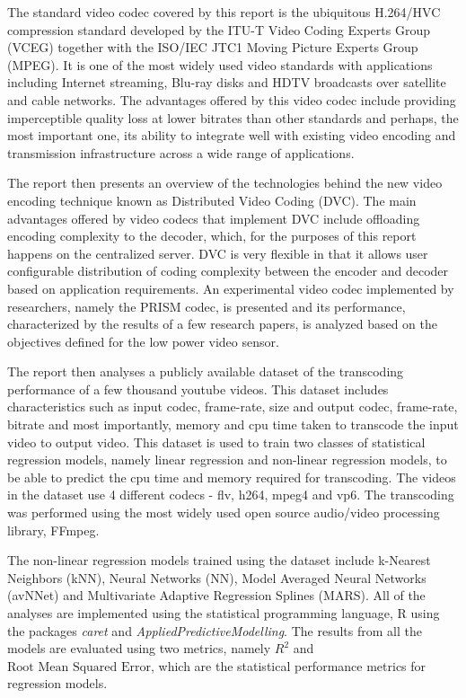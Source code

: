 \documentclass[letterpaper,12pt,titlepage,oneside,final]{report}
\begin{document}
    The standard video codec covered by this report is the ubiquitous H.264/HVC compression standard developed by the ITU-T Video Coding Experts Group (VCEG) together with the ISO/IEC JTC1 Moving Picture Experts Group (MPEG). It is one of the most widely used video standards with applications including Internet streaming, Blu-ray disks and HDTV broadcasts over satellite and cable networks. The advantages offered by this video codec include providing imperceptible quality loss at lower bitrates than other standards and perhaps, the most important one, its ability to integrate well with existing video encoding and transmission infrastructure across a wide range of applications. 

    The report then presents an overview of the technologies behind the new video encoding technique known as Distributed Video Coding (DVC). The main advantages offered by video codecs that implement DVC include offloading encoding complexity to the decoder, which, for the purposes of this report happens on the centralized server. DVC is very flexible in that it allows user configurable distribution of coding complexity between the encoder and decoder based on application requirements. An experimental video codec implemented by researchers, namely the PRISM codec, is presented and its performance, characterized by the results of a few research papers, is analyzed based on the objectives defined for the low power video sensor. 

    The report then analyses a publicly available dataset of the transcoding performance of a few thousand youtube videos. This dataset includes characteristics such as input codec, frame-rate, size and output codec, frame-rate, bitrate and most importantly, memory and cpu time taken to transcode the input video to output video. This dataset is used to train two classes of statistical regression models, namely linear regression and non-linear regression models, to be able to predict the cpu time and memory required for transcoding. The videos in the dataset use 4 different codecs - flv, h264, mpeg4 and vp6. The transcoding was performed using the most widely used open source audio/video processing library, FFmpeg.

    The non-linear regression models trained using the dataset include k-Nearest Neighbors (kNN), Neural Networks (NN), Model Averaged Neural Networks (avNNet) and Multivariate Adaptive Regression Splines (MARS). All of the analyses are implemented using the statistical programming language, R using the packages \textit{caret} and \textit{AppliedPredictiveModelling}. The results from all the models are evaluated using two metrics, namely $R^2$ and $\text{Root Mean Squared Error}$, which are the statistical performance metrics for regression models.
\end{document}
